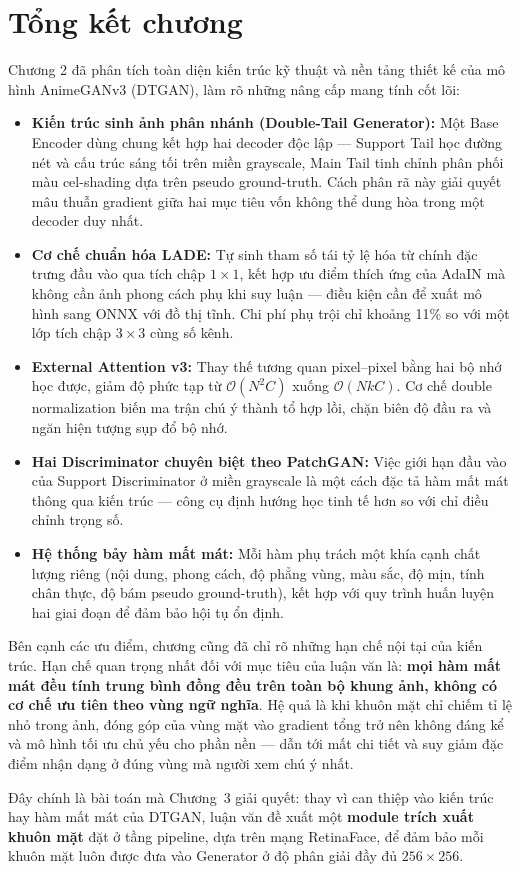 \section*{Tổng kết chương}

Chương 2 đã phân tích toàn diện kiến trúc kỹ thuật và nền tảng thiết kế của mô hình AnimeGANv3 (DTGAN), làm rõ những nâng cấp mang tính cốt lõi:

\begin{itemize}
    \item \textbf{Kiến trúc sinh ảnh phân nhánh (Double-Tail Generator):} Một Base Encoder dùng chung kết hợp hai decoder độc lập --- Support Tail học đường nét và cấu trúc sáng tối trên miền grayscale, Main Tail tinh chỉnh phân phối màu cel-shading dựa trên pseudo ground-truth. Cách phân rã này giải quyết mâu thuẫn gradient giữa hai mục tiêu vốn không thể dung hòa trong một decoder duy nhất.
    \item \textbf{Cơ chế chuẩn hóa LADE:} Tự sinh tham số tái tỷ lệ hóa từ chính đặc trưng đầu vào qua tích chập $1\times1$, kết hợp ưu điểm thích ứng của AdaIN mà không cần ảnh phong cách phụ khi suy luận --- điều kiện cần để xuất mô hình sang ONNX với đồ thị tĩnh. Chi phí phụ trội chỉ khoảng 11\% so với một lớp tích chập $3\times3$ cùng số kênh.
    \item \textbf{External Attention v3:} Thay thế tương quan pixel--pixel bằng hai bộ nhớ học được, giảm độ phức tạp từ $\mathcal{O}(N^2 C)$ xuống $\mathcal{O}(N k C)$. Cơ chế double normalization biến ma trận chú ý thành tổ hợp lồi, chặn biên độ đầu ra và ngăn hiện tượng sụp đổ bộ nhớ.
    \item \textbf{Hai Discriminator chuyên biệt theo PatchGAN:} Việc giới hạn đầu vào của Support Discriminator ở miền grayscale là một cách đặc tả hàm mất mát thông qua kiến trúc --- công cụ định hướng học tinh tế hơn so với chỉ điều chỉnh trọng số.
    \item \textbf{Hệ thống bảy hàm mất mát:} Mỗi hàm phụ trách một khía cạnh chất lượng riêng (nội dung, phong cách, độ phẳng vùng, màu sắc, độ mịn, tính chân thực, độ bám pseudo ground-truth), kết hợp với quy trình huấn luyện hai giai đoạn để đảm bảo hội tụ ổn định.
\end{itemize}

Bên cạnh các ưu điểm, chương cũng đã chỉ rõ những hạn chế nội tại của kiến trúc. Hạn chế quan trọng nhất đối với mục tiêu của luận văn là: \textbf{mọi hàm mất mát đều tính trung bình đồng đều trên toàn bộ khung ảnh, không có cơ chế ưu tiên theo vùng ngữ nghĩa}. Hệ quả là khi khuôn mặt chỉ chiếm tỉ lệ nhỏ trong ảnh, đóng góp của vùng mặt vào gradient tổng trở nên không đáng kể và mô hình tối ưu chủ yếu cho phần nền --- dẫn tới mất chi tiết và suy giảm đặc điểm nhận dạng ở đúng vùng mà người xem chú ý nhất.

Đây chính là bài toán mà Chương~3 giải quyết: thay vì can thiệp vào kiến trúc hay hàm mất mát của DTGAN, luận văn đề xuất một \textbf{module trích xuất khuôn mặt} đặt ở tầng pipeline, dựa trên mạng RetinaFace, để đảm bảo mỗi khuôn mặt luôn được đưa vào Generator ở độ phân giải đầy đủ $256 \times 256$.